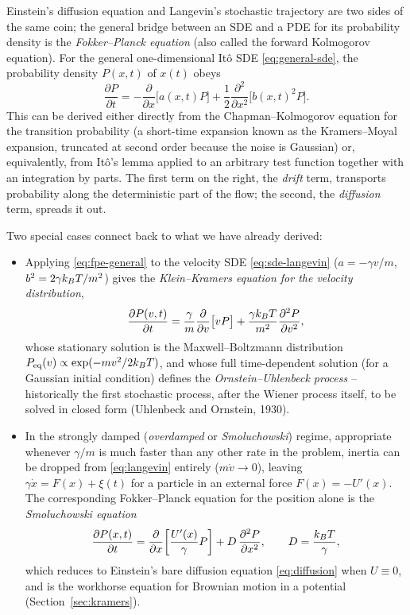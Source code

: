 Einstein's diffusion equation and Langevin's stochastic trajectory are two
sides of the same coin; the general bridge between an SDE and a PDE for
its probability density is the \emph{Fokker--Planck equation} (also called
the forward Kolmogorov equation). For the general one-dimensional It\^o
SDE \eqref{eq:general-sde}, the probability density $P(x,t)$ of $x(t)$
obeys
\begin{equation}
\frac{\partial P}{\partial t}
= -\frac{\partial}{\partial x}\bigl[a(x,t)P\bigr]
+ \frac{1}{2}\frac{\partial^2}{\partial x^2}\bigl[b(x,t)^2 P\bigr].
\label{eq:fpe-general}
\end{equation}
This can be derived either directly from the Chapman--Kolmogorov equation
for the transition probability (a short-time expansion known as the
Kramers--Moyal expansion, truncated at second order because the noise is
Gaussian) or, equivalently, from It\^o's lemma applied to an arbitrary
test function together with an integration by parts. The first term on the
right, the \emph{drift} term, transports probability along the
deterministic part of the flow; the second, the \emph{diffusion} term,
spreads it out.

Two special cases connect back to what we have already derived:
\begin{itemize}[leftmargin=1.6em]
\item Applying \eqref{eq:fpe-general} to the velocity SDE
\eqref{eq:sde-langevin} ($a = -\gamma v/m$, $b^2 = 2\gamma k_{B} T/m^2$) gives
the \emph{Klein--Kramers equation for the velocity distribution},
\begin{equation}
\frac{\partial P(v,t)}{\partial t}
= \frac{\gamma}{m}\frac{\partial}{\partial v}\bigl[vP\bigr]
+ \frac{\gamma k_{B} T}{m^2}\frac{\partial^2 P}{\partial v^2},
\label{eq:ou-fpe}
\end{equation}
whose stationary solution is the Maxwell--Boltzmann distribution
$P_{\rm eq}(v)\propto \exp(-mv^2/2k_{B} T)$, and whose full time-dependent
solution (for a Gaussian initial condition) defines the
\emph{Ornstein--Uhlenbeck process} -- historically the first stochastic
process, after the Wiener process itself, to be solved in closed form
(Uhlenbeck and Ornstein, 1930).
\item In the strongly damped (\emph{overdamped} or \emph{Smoluchowski})
regime, appropriate whenever $\gamma/m$ is much faster than any other rate
in the problem, inertia can be dropped from \eqref{eq:langevin} entirely
($m\dot v \to 0$), leaving $\gamma \dot x = F(x) + \xi(t)$ for a particle in
an external force $F(x) = -U'(x)$. The corresponding Fokker--Planck
equation for the position alone is the \emph{Smoluchowski equation}
\begin{equation}
\frac{\partial P(x,t)}{\partial t}
= \frac{\partial}{\partial x}\!\left[\frac{U'(x)}{\gamma}P\right]
+ D\,\frac{\partial^2 P}{\partial x^2}, \qquad D = \frac{k_{B} T}{\gamma},
\label{eq:smoluchowski}
\end{equation}
which reduces to Einstein's bare diffusion equation \eqref{eq:diffusion}
when $U\equiv 0$, and is the workhorse equation for Brownian motion in a
potential (Section~\ref{sec:kramers}).
\end{itemize}

